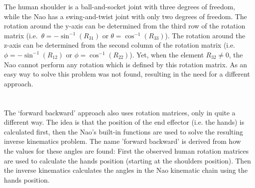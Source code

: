 \documentclass[letterpaper, 10pt, conference]{ieeeconf}
\begin{document}

The human shoulder is a ball-and-socket joint with three degrees of freedom\cite{Woodson1992}, while the Nao has a swing-and-twist joint with only two degrees of freedom. 
The rotation around the y-axis can be determined from the third row of the rotation matrix (i.e.\ $\theta = - \sin^{-1}(R_{31})$ or $\theta =  \cos^{-1}(R_{33})$).
The rotation around the z-axis can be determined from the second column of the rotation matrix (i.e.\ $\phi = - \sin^{-1}(R_{12})$ or $\phi =  \cos^{-1}(R_{22})$).
Yet, when the element $R_{32} \neq 0$, the Nao cannot perform any rotation which is defined by this rotation matrix.
As an easy way to solve this problem was not found, resulting in the need for a different approach. \\\\
\\
The ‘forward backward’ approach also uses rotation matrices, only in quite a different way. 
The idea is that the position of the end effector (i.e. the hands) is calculated first, then the Nao's built-in functions are used to solve the resulting inverse kinematics problem. 
The name 'forward backward' is derived from how the values for these angles are found: First the observed human rotation matrices are used to calculate the hands position (starting at the shoulders position). Then the inverse kinematics calculates the angles in the Nao kinematic chain using the hands position. 
\end{document}
